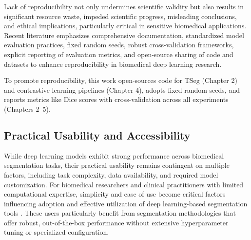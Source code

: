 \documentclass[./dissertation.tex]{subfiles}
\begin{document}
Lack of reproducibility not only undermines scientific validity but also results in significant resource waste, impeded scientific progress, misleading conclusions, and ethical implications, particularly critical in sensitive biomedical applications. Recent literature emphasizes comprehensive documentation, standardized model evaluation practices, fixed random seeds, robust cross-validation frameworks, explicit reporting of evaluation metrics, and open-source sharing of code and datasets to enhance reproducibility in biomedical deep learning research.

To promote reproducibility, this work open-sources code for TSeg (Chapter 2) and contrastive learning pipelines (Chapter 4), adopts fixed random seeds, and reports metrics like Dice scores with cross-validation across all experiments (Chapters 2–5).



\subsection{Practical Usability and Accessibility}
While deep learning models exhibit strong performance across biomedical segmentation tasks, their practical usability remains contingent on multiple factors, including task complexity, data availability, and required model customization. For biomedical researchers and clinical practitioners with limited computational expertise, simplicity and ease of use become critical factors influencing adoption and effective utilization of deep learning-based segmentation tools \cite{wang2021annotation}. These users particularly benefit from segmentation methodologies that offer robust, out-of-the-box performance without extensive hyperparameter tuning or specialized configuration.
\end{document}
